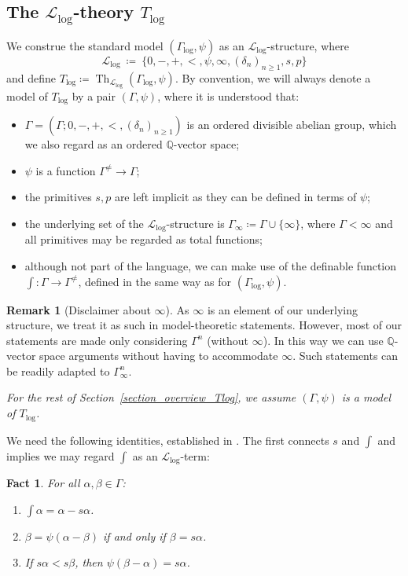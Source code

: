 \documentclass[11pt]{amsart}
\theoremstyle{plain}
\newtheorem{fact}[thm]{Fact}
\theoremstyle{definition}
\newtheorem{remark}[thm]{Remark}
\numberwithin{equation}{section}
\newcommand\Q{\mathbb{Q}}
\newcommand\calL{\mathcal{L}}
\newcommand\0{\varnothing}
\begin{document}
\subsection{The \texorpdfstring{$\calL_{\log}$}{Lₗₒ₉}-theory \texorpdfstring{$T_{\log}$}{Tₗₒ₉}} We construe the standard model $(\Gamma_{\log},\psi)$ as an $\calL_{\log}$-structure, where
\[
\calL_{\log} \ \coloneqq \ \{0,-,+,<,\psi,\infty,(\delta_n)_{n\geq 1},s,p\}
\]
and define $T_{\log}\coloneqq\operatorname{Th}_{\calL_{\log}}(\Gamma_{\log},\psi)$.
By convention, we will always denote a model of $T_{\log}$ by a pair $(\Gamma,\psi)$, where it is understood that:
\begin{itemize}
\item $\Gamma=(\Gamma;0,-,+,<,(\delta_n)_{n\geq 1})$ is an ordered divisible abelian group, which we also regard as an ordered $\Q$-vector space;
\item $\psi$ is a function $\Gamma^{\neq}\to\Gamma$;
\item the primitives $s,p$ are left implicit as they can be defined in terms of $\psi$;
\item the underlying set of the $\calL_{\log}$-structure is $\Gamma_{\infty}\coloneqq\Gamma\cup\{\infty\}$, where $\Gamma<\infty$ and all primitives may be regarded as total functions;
\item although not part of the language, we can make use of the definable function $\int\colon\Gamma\to\Gamma^{\neq}$, defined in the same way as for $(\Gamma_{\log},\psi)$. \end{itemize}


\begin{remark}[Disclaimer about $\infty$] As $\infty$ is an element of our underlying structure, we treat it as such in model-theoretic statements. However, most of our statements are made only considering $\Gamma^n$ (without $\infty$). In this way we can use $\Q$-vector space arguments without having to accommodate $\infty$. Such statements can be readily adapted to  $\Gamma_{\infty}^n$. 
\end{remark}

\noindent
\emph{For the rest of Section~\ref{section_overview_Tlog}, we assume $(\Gamma,\psi)$ is a model of $T_{\log}$.}

\medskip\noindent
We need the following identities, established in \cite[Lemmas~3.2, 3.7, and 3.4]{GehretACTlog}.
The first connects $s$ and $\int$ and implies we may regard $\int$ as an $\calL_{\log}$-term:


\begin{fact}\label{fact_identities}
For all $\alpha,\beta\in\Gamma$:
\begin{enumerate}[itemindent=8em]
    \item[Integral Identity.] $\textstyle{\int}\alpha=\alpha-s\alpha$.
    \item[Fixed Point Identity.] $\beta=\psi(\alpha-\beta)$ if and only if $\beta=s\alpha$.
    \item[Successor Identity.] If $s\alpha<s\beta$, then $\psi(\beta-\alpha)=s\alpha$.
\end{enumerate}
\end{fact}
\end{document}

